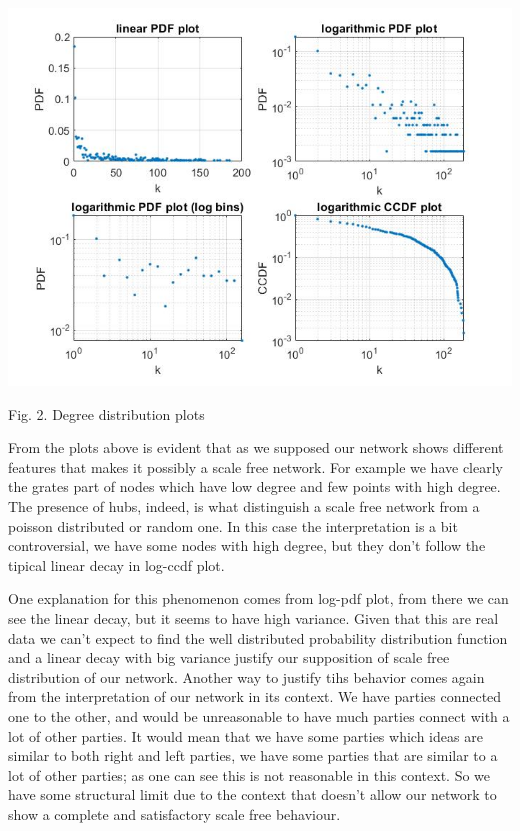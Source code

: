 \documentclass{article}%
\begin{document}
\includegraphics[scale=0.5]{Degree_distr}

\begin{center}
\begin{small}
Fig. 2. Degree distribution plots
\end{small}
\end{center}


From the plots above is evident that as we supposed our network shows different features that makes it possibly a scale free network. For example we have clearly the grates part of nodes which have low degree and few points with high degree. The presence of hubs, indeed, is what distinguish a scale free network from a poisson distributed or random one. In this case the interpretation is a bit controversial, we have some nodes with high degree, but they don't follow the tipical linear decay in log-ccdf plot. 

One explanation for this phenomenon comes from log-pdf plot, from there we can see the linear decay, but it seems to have high variance. Given that this are real data we can't expect to find the well distributed probability distribution function and a linear decay with big variance justify our supposition of scale free distribution of our network.
Another way to justify tihs behavior comes again from the interpretation of our network in its context. We have parties connected one to the other, and would be unreasonable to have much parties connect with a lot of other parties. It would mean that we have some parties which ideas are similar to both right and left parties, we have some parties that are similar to a lot of other parties; as one can see this is not reasonable in this context. So we have some structural limit due to the context that doesn't allow our network to show a complete and satisfactory scale free behaviour.
\\
\end{document}
